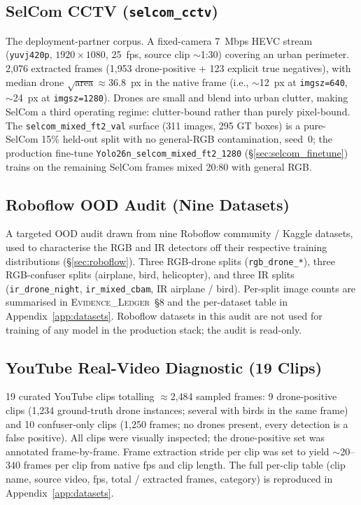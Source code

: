 \documentclass[12pt,a4paper,oneside,openright]{book}
\begin{document}
\subsection{SelCom CCTV (\texttt{selcom\_cctv})}
\label{sec:ds_selcom}

The deployment-partner corpus. A fixed-camera 7~Mbps HEVC stream (\texttt{yuvj420p}, $1920{\times}1080$, 25~fps, source clip $\sim$1:30) covering an urban perimeter. 2{,}076 extracted frames (1{,}953 drone-positive + 123 explicit true negatives), with median drone $\sqrt{\text{area}} \approx 36.8$~px in the native frame (i.e., $\sim$12~px at \texttt{imgsz=640}, $\sim$24~px at \texttt{imgsz=1280}). Drones are small and blend into urban clutter, making SelCom a third operating regime: clutter-bound rather than purely pixel-bound. The \texttt{selcom\_mixed\_ft2\_val} surface (311 images, 295 GT boxes) is a pure-SelCom 15\% held-out split with no general-RGB contamination, seed~0; the production fine-tune \texttt{Yolo26n\_selcom\_mixed\_ft2\_1280} (\S\ref{sec:selcom_finetune}) trains on the remaining SelCom frames mixed 20:80 with general RGB.

\subsection{Roboflow OOD Audit (Nine Datasets)}
\label{sec:ds_roboflow}

A targeted OOD audit drawn from nine Roboflow community / Kaggle datasets, used to characterise the RGB and IR detectors off their respective training distributions (\S\ref{sec:roboflow}). Three RGB-drone splits (\texttt{rgb\_drone\_*}), three RGB-confuser splits (airplane, bird, helicopter), and three IR splits (\texttt{ir\_drone\_night}, \texttt{ir\_mixed\_cbam}, IR airplane / bird). Per-split image counts are summarised in \textsc{Evidence\_Ledger}~\S8 and the per-dataset table in Appendix~\ref{app:datasets}. Roboflow datasets in this audit are not used for training of any model in the production stack; the audit is read-only.

\subsection{YouTube Real-Video Diagnostic (19 Clips)}
\label{sec:ds_youtube}

19 curated YouTube clips totalling $\approx$2{,}484 sampled frames: 9 drone-positive clips (1{,}234 ground-truth drone instances; several with birds in the same frame) and 10 confuser-only clips (1{,}250 frames; no drones present, every detection is a false positive). All clips were visually inspected; the drone-positive set was annotated frame-by-frame. Frame extraction stride per clip was set to yield $\sim$20--340 frames per clip from native fps and clip length. The full per-clip table (clip name, source video, fps, total / extracted frames, category) is reproduced in Appendix~\ref{app:datasets}.
\end{document}
